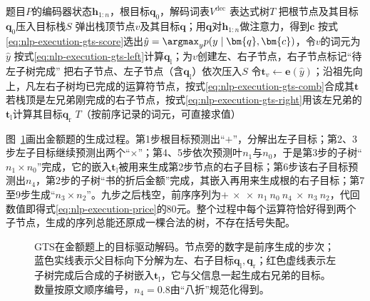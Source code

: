 \begin{algorithm}
  \label{alg:nlp-execution-gts}
  \begin{algorithmic}[1]
    \Require 题目$P$的编码器状态$\bm{h}_{1:n}$，根目标$\bm{q}_0$，解码词表$V^{\mathrm{dec}}$
    \Ensure 表达式树$T$
    \State 把根节点及其目标$\bm{q}_0$压入目标栈$S$
      \State 弹出栈顶节点$v$及其目标$\bm{q}$；用$\bm{q}$对$\bm{h}_{1:n}$做注意力，得到$\bm{c}$
      \State 按式\eqref{eq:nlp-execution-gts-score}选出$\hat y=\argmax_{y}p(y\mid\bm{q},\bm{c})$，令$v$的词元为$\hat y$
        \State 按式\eqref{eq:nlp-execution-gts-left}计算$\bm{q}_{\mathrm{l}}$；为$v$创建左、右子节点，右子节点标记“待左子树完成”
        \State 把右子节点、左子节点（含$\bm{q}_{\mathrm{l}}$）依次压入$S$ 
      \Else
        \State 令$\bm{t}_v\gets\bm{e}(\hat y)$；沿祖先向上，凡左右子树均已完成的运算符节点，按式\eqref{eq:nlp-execution-gts-comb}合成其$\bm{t}$
        \State 若栈顶是左兄弟刚完成的右子节点，按式\eqref{eq:nlp-execution-gts-right}用该左兄弟的$\bm{t}_{\mathrm{l}}$计算其目标$\bm{q}_{\mathrm{r}}$
      \EndIf
    \EndWhile
    \State \Return $T$（按前序记录的词元，可直接求值）
  \end{algorithmic}
\end{algorithm}

图~\ref{fig:nlp-execution-gts}画出金额题的生成过程。第1步根目标预测出“$+$”，分解出左子目标；第2、3步左子目标继续预测出两个“$\times$”；第4、5步依次预测叶$n_1$与$n_0$，于是第3步的子树“$n_1\times n_0$”完成，它的嵌入$\bm{t}_{\mathrm{l}}$被用来生成第2步节点的右子目标；第6步该右子目标预测出$n_4$，第2步的子树“书的折后金额”完成，其嵌入再用来生成根的右子目标；第7至9步生成“$n_3\times n_2$”。九步之后栈空，前序序列为$+\ \times\ \times\ n_1\ n_0\ n_4\ \times\ n_3\ n_2$，代回数值即得式\eqref{eq:nlp-execution-price}的80元。整个过程中每个运算符恰好得到两个子节点，生成的序列总能还原成一棵合法的树，不存在括号失配。

\begin{figure}[!t]
  \centering
  
  \caption{GTS在金额题上的目标驱动解码。节点旁的数字是前序生成的步次；蓝色实线表示父目标向下分解为左、右子目标$\bm{q}_{\mathrm{l}},\bm{q}_{\mathrm{r}}$；红色虚线表示左子树完成后合成的子树嵌入$\bm{t}_{\mathrm{l}}$，它与父信息一起生成右兄弟的目标。数量按原文顺序编号，$n_4=0.8$由“八折”规范化得到。}
  \label{fig:nlp-execution-gts}
\end{figure}

